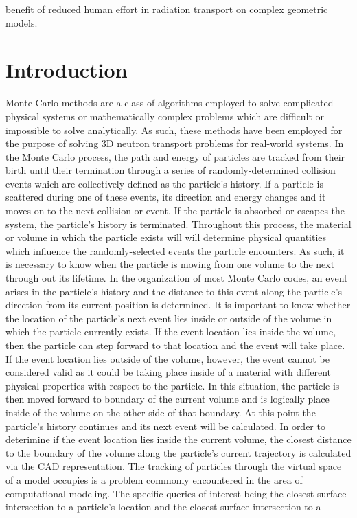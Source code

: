\documentclass[12pt, a4paper]{article}
\begin{document}
benefit of reduced human effort in radiation transport on complex geometric models.

\section{Introduction}%


Monte Carlo methods are a class of algorithms employed to solve complicated physical systems or mathematically complex problems which are difficult or impossible to solve analytically. As such, these methods have been employed for the purpose of solving 3D neutron transport problems for real-world systems. In the Monte Carlo process, the path and energy of particles are tracked from their birth until their termination through a series of randomly-determined collision events which are collectively defined as the particle's history. If a particle is scattered during one of these events, its direction and energy changes and it moves on to the next collision or event. If the particle is absorbed or escapes the system, the particle's history is terminated. Throughout this process, the material or volume in which the particle exists will will determine physical quantities which influence the randomly-selected events the particle encounters. As such, it is necessary to know when the particle is moving from one volume to the next through out its lifetime. In the organization of most Monte Carlo codes, an event arises in the particle's history and the distance to this event along the particle's direction from its current position is determined. It is important to know whether the location of the particle's next event lies inside or outside of the volume in which the particle currently exists. If the event location lies inside the volume, then the particle can step forward to that location and the event will take place. If the event location lies outside of the volume, however, the event cannot be considered valid as it could be taking place inside of a material with different physical properties with respect to the particle. In this situation, the particle is then moved forward to boundary of the current volume and is logically place inside of the volume on the other side of that boundary. At this point the particle's history continues and its next event will be calculated. In order to deterimine if the event location lies inside the current volume, the closest distance to the boundary of the volume along the particle's current trajectory is calculated via the CAD representation. The tracking of particles through the virtual space of a model occupies is a problem commonly encountered in the area of computational modeling. The specific queries of interest being the closest surface intersection to a particle's location and the closest surface intersection to a 
\end{document}
